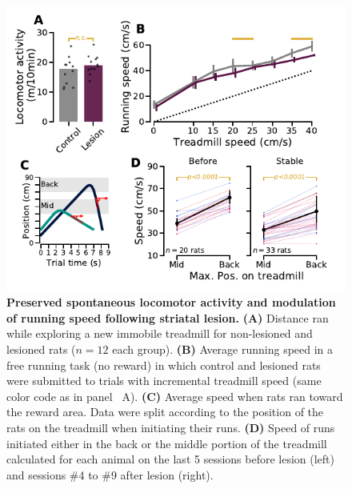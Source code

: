 \begin{figure}[bth!]
 \begin{center}
	\includegraphics[scale=1]{ch-lesion/figures/MotorPreserved.pdf}
	\caption[Preserved Motor Control After Striatal Lesion]
	{\textbf{Preserved spontaneous locomotor activity and modulation of running speed following striatal lesion.}
	\textbf{(A)} Distance ran while exploring a new immobile treadmill for non-lesioned and lesioned rats ($n=12$ each group).
	\textbf{(B)} Average running speed in a free running task (no reward) in which control and lesioned rats were submitted to trials with incremental treadmill speed (same color code as in panel ~A).
	\textbf{(C)} Average speed when rats ran toward the reward area.
	Data were split according to the position of the rats on the treadmill when initiating their runs.
	\textbf{(D)} Speed of runs initiated either in the back or the middle portion of the treadmill calculated for each animal on the last 5 sessions before lesion (left) and sessions \#4 to \#9 after lesion (right).
	}
	\label{fig:lesion:motorOk}
 \end{center}
\end{figure}